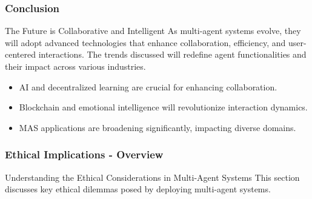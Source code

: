 \documentclass[aspectratio=169]{beamer}
\begin{document}
\begin{frame}[fragile]
    \frametitle{Conclusion}
    \begin{block}{The Future is Collaborative and Intelligent}
        As multi-agent systems evolve, they will adopt advanced technologies that enhance collaboration, efficiency, and user-centered interactions. 
        The trends discussed will redefine agent functionalities and their impact across various industries.
    \end{block}
    
    \begin{itemize}
        \item AI and decentralized learning are crucial for enhancing collaboration.
        \item Blockchain and emotional intelligence will revolutionize interaction dynamics.
        \item MAS applications are broadening significantly, impacting diverse domains.
    \end{itemize}
\end{frame}

\begin{frame}[fragile]
    \frametitle{Ethical Implications - Overview}
    \begin{block}{Understanding the Ethical Considerations in Multi-Agent Systems}
        This section discusses key ethical dilemmas posed by deploying multi-agent systems. 
    \end{block}
\end{frame}
\end{document}
